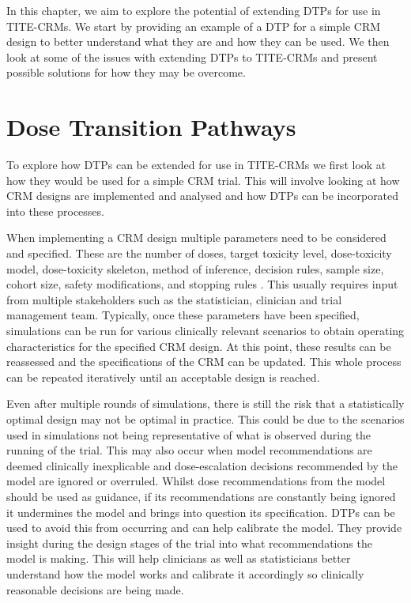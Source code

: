 In this chapter, we aim to explore the potential of extending DTPs for use in TITE-CRMs. We start by providing an example of a DTP for a simple CRM design to better understand what they are and how they can be used. We then look at some of the issues with extending DTPs to TITE-CRMs and present possible solutions for how they may be overcome.



\section{Dose Transition Pathways}
\label{tite-dtp:DTPs}

To explore how DTPs can be extended for use in TITE-CRMs we first look at how they would be used for a simple CRM trial. This will involve looking at how CRM designs are implemented and analysed and how DTPs can be incorporated into these processes. 

When implementing a CRM design multiple parameters need to be considered and specified. These are the number of doses, target toxicity level, dose-toxicity model, dose-toxicity skeleton, method of inference, decision rules, sample size, cohort size, safety modifications, and stopping rules \cite{wheelerHowDesignDosefinding2019}. This usually requires input from multiple stakeholders such as the statistician, clinician and trial management team. Typically, once these parameters have been specified, simulations can be run for various clinically relevant scenarios to obtain operating characteristics for the specified CRM design. At this point, these results can be reassessed and the specifications of the CRM can be updated. This whole process can be repeated iteratively until an acceptable design is reached. 

Even after multiple rounds of simulations, there is still the risk that a statistically optimal design may not be optimal in practice. This could be due to the scenarios used in simulations not being representative of what is observed during the running of the trial. This may also occur when model recommendations are deemed clinically inexplicable and dose-escalation decisions recommended by the model are ignored or overruled. Whilst dose recommendations from the model should be used as guidance, if its recommendations are constantly being ignored it undermines the model and brings into question its specification. DTPs can be used to avoid this from occurring and can help calibrate the model. They provide insight during the design stages of the trial into what recommendations the model is making. This will help clinicians as well as statisticians better understand how the model works and calibrate it accordingly so clinically reasonable decisions are being made.   

